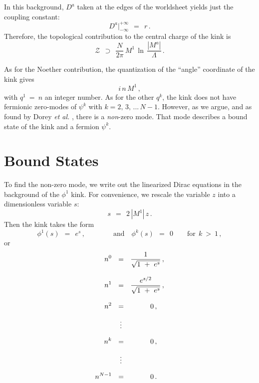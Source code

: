 \documentclass[epsfig,12pt]{article}
\def\beq{\begin{equation}}
\def\eeq{\end{equation}}
\def\beq{\begin{equation}}
\def\eeq{\end{equation}}
\newcommand{\mc}[1]{\mathcal{#1}}
\begin{document}
       In this background, $ D^a $ taken at the edges of the worldsheet yields just the coupling constant:
\beq
       D^a \Big|^{\scriptscriptstyle +\infty}_{\scriptscriptstyle -\infty} ~~=~~    r\,.
\eeq
       Therefore, the topological contribution to the central charge of the kink is
\beq
       \mc{Z} ~~\supset~~ \frac{N}{2\pi}\, M^1\, \ln\, \frac{   |M^a|   }
                                                            {  \Lambda  }\,.
\eeq

       As for the Noether contribution, the quantization of the ``angle'' coordinate of the kink gives 
\beq
       i\, n\, M^1\,,
\eeq
       with $ q^1 ~=~ n $ an integer number.
       As for the other $ q^k $, the kink does not have fermionic zero-modes of $ \psi^k $ with $ k = 2,\, 3,\, ...\, N-1 $.
       However, as we argue, and as found by Dorey {\it et al.} \cite{Dorey:1999zk}, there is a
       {\it non}-zero mode.
       That mode describes a bound state of the kink and a fermion $ \psi^k $.

\section{Bound States}
\setcounter{equation}{0}

       To find the non-zero mode, we write out the linearized Dirac equations in the background
       of the $ \phi^1 $ kink.
       For convenience, we rescale the variable $ z $ into a dimensionless variable $ s $:
\beq
       s ~~=~~ 2\, |M^1|\, z\,.
\eeq
       Then the kink takes the form
\beq
       \phi^1(s) ~~=~~ e^s\,,\qquad\qquad\text{and}\quad \phi^k(s) ~~=~~ 0 \qquad \text{for}~~ k ~>~ 1\,,
\eeq
       or
\begin{align}
%
\notag
       n^0  & ~~=~~ \frac {             1              }
                          {    \sqrt{ 1 ~+~ e^s }      }\,, \\[3mm]
%
\notag
       n^1  & ~~=~~ \frac {          e^{s/2}           }
                          {    \sqrt{ 1 ~+~ e^s }      }\,, \\[3mm]
%
\notag
       n^2  & ~~=~~ \qquad~~\, 0\,,  \\[2mm]
%	 
            & ~~~\,\vdots          \\[2mm]
%
\notag
       n^k  & ~~=~~ \qquad~~\, 0\,,  \\[2mm]
%	 
\notag
            & ~~~\,\vdots          \\[2mm]
%
\notag
       n^{N-1} & ~~=~~ \qquad~~\, 0\,.                
\end{align}
\end{document}
